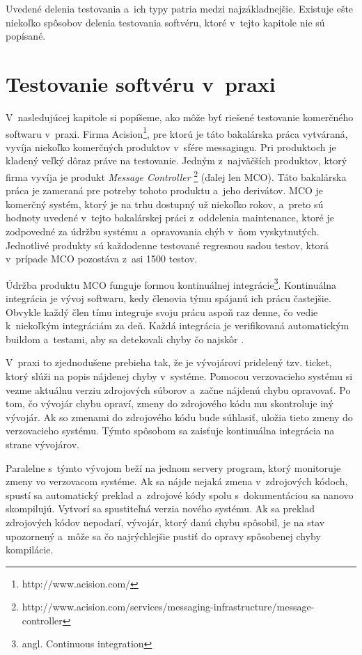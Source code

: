 Uvedené delenia testovania a~ich typy patria medzi najzákladnejšie. 
Existuje ešte niekoľko spôsobov delenia testovania softvéru, ktoré v~tejto kapitole nie sú popísané.

\section{Testovanie softvéru v~praxi} \label{sekcia:testovanie_v_praxi}
V~nasledujúcej kapitole si popíšeme, ako môže byť riešené testovanie komerčného softwaru v~praxi.
Firma Acision\footnote{http://www.acision.com/}, pre ktorú je táto bakalárska práca vytváraná, vyvíja niekoľko komerčných produktov
v~sfére messagingu. Pri produktoch je kladený veľký dôraz práve na testovanie.
Jedným z~najväčších produktov, ktorý firma vyvíja je produkt {\it Message Controller}
\footnote{http://www.acision.com/services/messaging-infrastructure/message-controller} (ďalej len MCO).
Táto bakalárska práca je zameraná pre potreby tohoto produktu a~jeho derivátov.
MCO je komerčný systém, ktorý je na trhu dostupný už niekoľko rokov, a~preto sú hodnoty uvedené v~tejto 
bakalárskej práci z~oddelenia maintenance, ktoré je zodpovedné za údržbu systému a~opravovania chýb v~ňom vyskytnutých.
Jednotlivé produkty sú každodenne testované regresnou sadou testov, ktorá v~prípade MCO pozostáva z~asi 1500 testov.

Údržba produktu MCO funguje formou kontinuálnej integrácie\footnote{angl. Continuous integration}.
Kontinuálna integrácia je vývoj softwaru, kedy členovia týmu spájanú ich prácu častejšie.
Obvykle každý člen tímu integruje svoju prácu aspoň raz denne, čo vedie k~niekoľkým integráciám za deň.
Každá integrácia je verifikovaná automatickým buildom a~testami, aby sa detekovali chyby čo najskôr \cite{Continuous_integration}.

V~praxi to zjednodušene prebieha tak, že je vývojárovi pridelený tzv. ticket, ktorý slúži na popis
nájdenej chyby v~systéme. Pomocou verzovacieho systému si vezme aktuálnu verziu zdrojových súborov a~začne nájdenú chybu opravovať.
Po tom, čo vývojár chybu opraví, zmeny do zdrojového kódu mu skontroluje iný vývojár.
Ak so zmenami do zdrojového kódu bude súhlasiť, uložia tieto zmeny do verzovacieho systému.
Týmto spôsobom sa zaisťuje kontinuálna integrácia na strane vývojárov.

Paralelne s~týmto vývojom beží na jednom servery program, ktorý monitoruje zmeny vo verzovacom systéme.
Ak sa nájde nejaká zmena v~zdrojových kódoch, spustí sa automatický preklad a~zdrojové kódy spolu s~dokumentáciou
sa nanovo skompilujú. Vytvorí sa spustiteľná verzia nového systému. Ak sa preklad zdrojových kódov nepodarí, vývojár, ktorý 
danú chybu spôsobil, je na stav upozornený a~môže sa čo najrýchlejšie pustiť do opravy spôsobenej chyby kompilácie.

